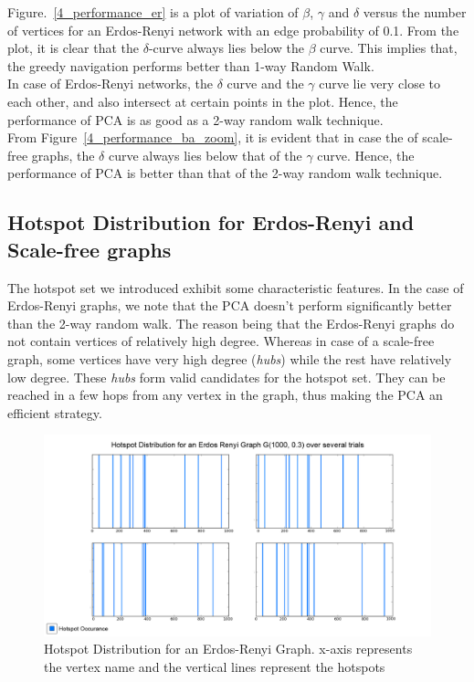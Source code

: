 \documentclass[10pt, conference, compsocconf]{IEEEtran}
\begin{document}
Figure.~\ref{4_performance_er} is a plot of variation of $\beta$, $\gamma$ and $\delta$ versus the number of vertices for an Erdos-Renyi network with an edge probability of 0.1. From the plot, it is clear that the $\delta$-curve always lies below the $\beta$ curve. This implies that, the greedy navigation performs better than 1-way Random Walk.\\

In case of Erdos-Renyi networks, the $\delta$ curve and the $\gamma$ curve lie very close to each other, and also intersect at certain points in the plot. Hence, the performance of PCA is as good as a 2-way random walk technique.\\

From Figure~\ref{4_performance_ba_zoom}, it is evident that in case the of scale-free graphs, the $\delta$ curve always lies below that of the $\gamma$ curve. Hence, the performance of PCA is better than that of the 2-way random walk technique.\\

\subsection{Hotspot Distribution for Erdos-Renyi and Scale-free graphs}

The hotspot set we introduced exhibit some characteristic features. In the case of Erdos-Renyi graphs, we note that the PCA doesn't perform significantly better than the 2-way random walk. The reason being that the Erdos-Renyi graphs do not contain vertices of relatively high degree. Whereas in case of a scale-free graph, some vertices have very high degree (\emph{hubs}) while the rest have relatively low degree. These \emph{hubs} form valid candidates for the hotspot set. They can be reached in a few hops from any vertex in the graph, thus making the PCA an efficient strategy.

\begin{figure}[htp]
\begin{center}
\includegraphics[scale=0.17]{Results/erdos.png}
\caption{Hotspot Distribution for an Erdos-Renyi Graph. x-axis represents the vertex name and the vertical lines represent the hotspots}
\label{4_hotspot_er}
\end{center}
\end{figure}
\end{document}
